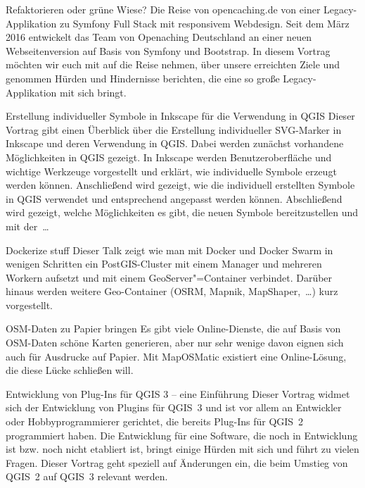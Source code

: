 %
{Refaktorieren oder grüne Wiese?}%
{Die Reise von opencaching.de von einer Legacy-Applikation zu Symfony Full Stack mit \mbox{responsivem} Webdesign.}%
{%
Seit dem März 2016 entwickelt das Team von Openaching Deutschland an einer neuen Webseitenversion
auf Basis von Symfony und Bootstrap. In diesem Vortrag möchten wir euch mit auf die Reise nehmen,
über unsere erreichten Ziele und genommen Hürden und Hindernisse berichten, die eine so große
Legacy-Applikation mit sich bringt.%
}


%
{Erstellung individueller Symbole in Inkscape für die Verwendung in QGIS}%
{}%
{%
Dieser Vortrag gibt einen Überblick über die Erstellung individueller SVG-Marker in Inkscape und
deren Verwendung in QGIS. Dabei werden zunächst vorhandene Möglichkeiten in QGIS gezeigt. In
Inkscape werden Benutzeroberfläche und wichtige Werkzeuge vorgestellt und erklärt, wie individuelle
Symbole erzeugt werden können. Anschließend wird gezeigt, wie die individuell erstellten Symbole in
QGIS verwendet und entsprechend angepasst werden können.  Abschließend wird gezeigt, welche
Möglichkeiten es gibt, die neuen Symbole bereitzustellen und  mit der~\dots%
}

%
{Dockerize stuff}%
{}%
{%
Dieser Talk zeigt wie man mit Docker und Docker Swarm in wenigen Schritten ein PostGIS-Cluster mit
einem Manager und mehreren Workern aufsetzt und mit einem GeoServer"=Container verbindet. Darüber
hinaus werden weitere Geo-Container (OSRM, Mapnik, MapShaper,~\dots) kurz vorgestellt.%
}

%
{OSM-Daten zu Papier bringen}%
{}%
{%
Es gibt viele Online-Dienste, die auf Basis von OSM-Daten schöne Karten generieren, aber nur sehr
wenige davon eignen sich auch für Ausdrucke auf Papier. Mit MapOSMatic existiert eine
Online-Lösung, die diese Lücke schließen will.%
}

%
{Entwicklung von Plug-Ins für QGIS 3 -- eine Einführung}%
{}%
{%
Dieser Vortrag widmet sich der Entwicklung von Plugins für QGIS~3 und ist vor allem an Entwickler
oder Hobbyprogrammierer gerichtet, die bereits Plug-Ins für QGIS~2 programmiert haben. Die
Entwicklung für eine Software, die noch in Entwicklung ist bzw. noch nicht etabliert ist, bringt
einige Hürden mit sich und führt zu vielen Fragen. Dieser Vortrag geht speziell auf Änderungen ein,
die beim Umstieg von QGIS~2 auf QGIS~3 relevant werden.%
}

